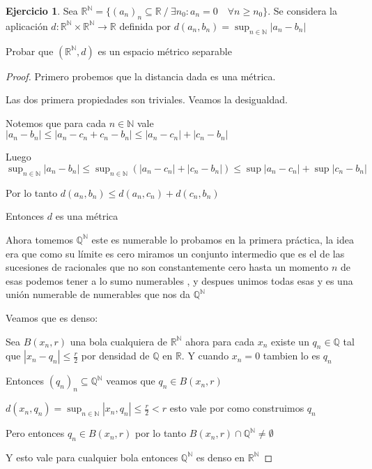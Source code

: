 \documentclass[12pt]{report}
\newcommand{\Q}{\mathbb{Q}}
\newcommand{\R}{\mathbb{R}}
\newcommand{\N}{\mathbb{N}}
\theoremstyle{definition}
\newtheorem{ej}{Ejercicio}
\begin{document}
\begin{ej}
	Sea $\R^{\N} = \{(a_n)_n \subseteq \R \ / \ \exists n_0:a_n =0 \quad \forall n \geq n_0\}$. Se considera la aplicación $d: \R^{\N} \times \R^{\N} \longrightarrow \R$ definida por $d(a_n,b_n) = \sup_{n \in \N} |a_n - b_n|$
	
	\noindent Probar que $(\R^{\N},d)$ es un espacio métrico separable
	\begin{proof}
		Primero probemos que la distancia dada es una métrica.

		Las dos primera propiedades son triviales. Veamos la desigualdad. 

		Notemos que para cada $n\in\N$ vale $|a_n - b_n| \leq |a_n - c_n + c_n -b_n| \leq |a_n - c_n| + |c_n -b_n|$ 

		Luego $\sup_{n\in\N} |a_n - b_n| \leq \sup_{n\in\N} (|a_n -c_n| + |c_n - b_n| ) \leq \sup |a_n - c_n| + \sup |c_n - b_n|$

		Por lo tanto $d(a_n,b_n) \leq d(a_n,c_n) + d(c_n,b_n)$

		Entonces $d$ es una métrica

		Ahora tomemos $\Q^{\N}$ este es numerable lo probamos en la primera práctica, la idea era que como su límite es cero miramos un conjunto intermedio que es el de las sucesiones de racionales que no son constantemente cero hasta un momento $n$ de esas podemos tener a lo sumo numerables , y despues unimos todas esas y es una unión numerable de numerables que nos da $\Q^{\N}$

		Veamos que es denso:

		Sea $B(x_n,r)$ una bola cualquiera de $\R^{\N}$ ahora para cada $x_n$ existe un $q_n \in \Q$ tal que $|x_n - q_n| \leq \frac{r}{2}$ por densidad de $\Q$ en $\R$. Y cuando $x_n = 0$ tambien lo es $q_n$ 

		Entonces $(q_n)_n \subseteq \Q^{\N} $ veamos que $q_n \in B(x_n,r)$

		$d(x_n,q_n) = \sup_{n\in \N} |x_n,q_n| \leq \frac{r}{2} < r$ esto vale por como construimos $q_n$

		Pero entonces $q_n \in B(x_n,r)$ por lo tanto $B(x_n,r) \cap \Q^{\N} \neq \emptyset$

		Y esto vale para cualquier bola entonces $\Q^{\N}$ es denso en $\R^{\N}$
	\end{proof}	
\end{ej}
\end{document}
